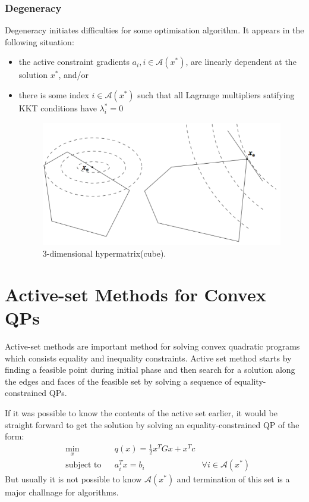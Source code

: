\subsubsection*{Degeneracy}
Degeneracy initiates difficulties for some optimisation algorithm. It appears in the following situation:
\begin{itemize}
	\item the active constraint gradients $a_i,i\in \mathcal{A}(x^*)$, are linearly dependent at the solution $x^*$, and/or
	\item there is some index $i\in \mathcal{A}(x^*)$ such that all Lagrange multipliers satifying KKT conditions have $\lambda_i^* = 0$
	
	\begin{figure}[h]
		\centering
			\includegraphics{Figures/Degeneracy_1.png}
			\decoRule
			\caption[hypercube]{3-dimensional hypermatrix(cube).}
		\label{fig:hypercube}
	\end{figure}

\end{itemize}








\section{Active-set Methods for Convex QPs}
Active-set methods are important method for solving convex quadratic programs which consists equality and inequality constraints. Active set method starts by finding a feasible point during initial phase and then search for a solution along the edges and faces of the feasible set by solving a sequence of equality-constrained QPs.

If it was possible to know the contents of the active set earlier, it would be straight forward to get the solution by solving an equality-constrained QP of the form:
\begin{equation*}
	\begin{aligned}
		& \underset{x}{\text{min}} & & q(x)= \frac{1}{2}x^{T}Gx+x^{T}c \\
& \text{subject to} & &  a_{i}^{T}x = b_i & \forall i\in \mathcal{A}(x^*)
	\end{aligned}
\end{equation*}
But usually it is not possible to know $\mathcal{A}(x^*)$ and termination of this set is a major challnage for algorithms.

